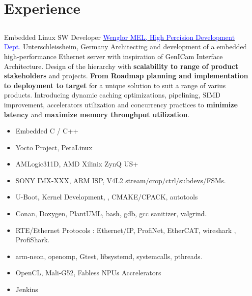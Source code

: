\section{Experience}

\vspace{2mm}
\subsection{\Large{\textcolor{red}{}}}
        { Embedded Linux SW Developer}
        {\href{https://www.wenglor.com/en/}{\textcolor{blue}{Wenglor MEL, High Percision Development Dept.}}}
        {Unterschleissheim, Germany}
        {
        \newline
        Architecting and development of a embedded high-performance Ethernet server with inspiration of GenICam Interface Architecture. 
          Design of the hierarchy with \textbf{scalability to range of product stakeholders} and projects. \textbf{From Roadmap planning and implementation to deployment to target} for a unique solution to suit a range of varius products.
          Introducing dynamic caching optimizations, pipelining, SIMD improvement, accelerators utilization and concurrency practices to \textbf{minimize latency} and \textbf{maximize memory throughput utilization}.
        }
        {
        \begin{itemize}
            \item Embedded C / C++
            \item Yocto Project, PetaLinux
            \item AMLogic311D, AMD Xilinix ZynQ US+
            \item SONY IMX-XXX,  ARM ISP, V4L2 stream/crop/ctrl/subdevs/FSMs.
            \item U-Boot, Kernel Development, , CMAKE/CPACK, autotools
            \item Conan, Doxygen, PlantUML, bash, gdb, gcc sanitizer, valgrind.
            \item RTE/Ethernet Protocols : Ethernet/IP, ProfiNet, EtherCAT, wireshark , ProfiShark.
            \item arm-neon, openomp, Gtest, libsystemd, systemcalls, pthreads.
            \item OpenCL, Mali-G52, Fabless NPUs Accrelerators
            \item Jenkins
        \end{itemize}
        }
        

